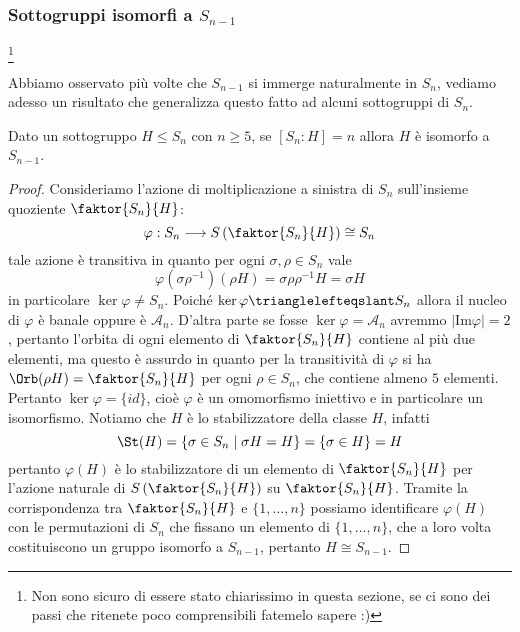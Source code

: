 \documentclass[11pt]{scrartcl}
\begin{document}
\subsubsection{Sottogruppi isomorfi a $S_{n - 1}$}\footnote{
    Non sono sicuro di essere stato chiarissimo in questa sezione, se ci 
    sono dei passi che ritenete poco comprensibili fatemelo sapere :)
}

Abbiamo osservato più volte che $S_{n - 1}$ si immerge naturalmente in $S_n$,
vediamo adesso un risultato che generalizza questo fatto ad alcuni sottogruppi di 
$S_n$.

\begin{proposition}
    \label{prop1.68}
    Dato un sottogruppo $H\leqslant S_n$ con $n \geq 5$, se $[S_n : H] = n$ allora $H$ è 
    isomorfo a $S_{n - 1}$.
\end{proposition}

\begin{proof}
    Consideriamo l'azione di moltiplicazione a sinistra di $S_n$ sull'insieme
    quoziente $\faktor{S_n}{H}$:
    \[
        \varphi: S_n\longrightarrow S\left(\faktor{S_n}{H}\right) \cong S_n
    \]
    tale azione è transitiva in quanto per ogni $\sigma, \rho \in S_n$ vale
    \[
        \varphi(\sigma\rho^{-1})(\rho H) = \sigma \rho\rho^{-1}H = \sigma H
    \]
    in particolare $\ker \varphi \neq S_n$. Poiché $\ker\varphi \trianglelefteqslant S_n$
    allora il nucleo di $\varphi$ è banale oppure è $\mathcal{A}_n$. D'altra 
    parte se fosse $\ker \varphi = \mathcal{A}_n$ avremmo $|\mathrm{Im}\varphi| = 2$,
    pertanto l'orbita di ogni elemento di $\faktor{S_n}{H}$ contiene al più 
    due elementi, ma questo è assurdo in quanto per la transitività di $\varphi$
    si ha $\Orb(\rho H) = \faktor{S_n}{H}$ per ogni $\rho \in S_n$, che contiene almeno $5$ elementi.
    Pertanto $\ker\varphi = \{id\}$, cioè $\varphi$ è un omomorfismo iniettivo e
    in particolare un isomorfismo.
    Notiamo che $H$ è lo stabilizzatore della classe $H$, infatti
    \[
        \St(H) = \{\sigma \in S_n \mid \sigma H = H\} = \{\sigma \in H\} = H
    \]
    pertanto $\varphi(H)$ è lo stabilizzatore di un elemento di $\faktor{S_n}{H}$
    per l'azione naturale di $S\left(\faktor{S_n}{H}\right)$ su $\faktor{S_n}{H}$.
    Tramite la corrispondenza tra $\faktor{S_n}{H}$ e $\{1, \ldots, n\}$
    possiamo identificare $\varphi(H)$ con le permutazioni di $S_n$ che fissano
    un elemento di $\{1, \ldots, n\}$, che a loro volta costituiscono un 
    gruppo isomorfo a $S_{n - 1}$, pertanto $H \cong S_{n - 1}$.
\end{proof}
\end{document}
